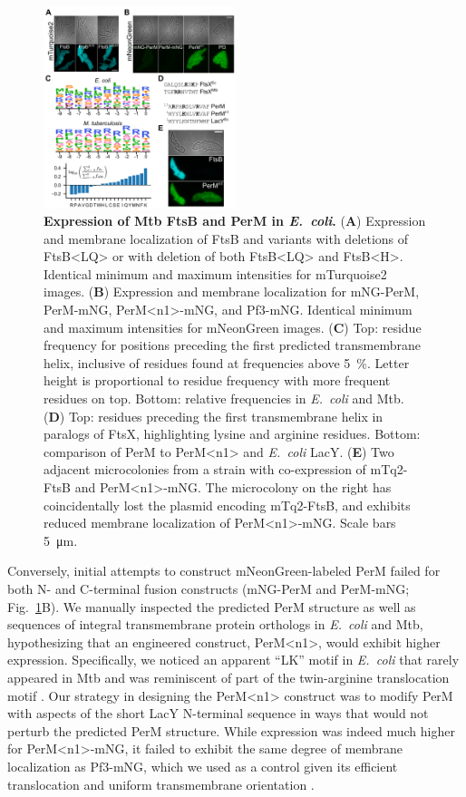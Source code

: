 \documentclass[twocolumn,pdflatex,sn-nature]{sn-jnl}%
\def\textsuperscript#1{<#1>}%
\newcommand\ec{\textit{E.~coli}}
\newcommand\mtb{Mtb}
\newcommand\ftsbLQ{FtsB\textsuperscript{LQ}}
\newcommand\ftsbH{FtsB\textsuperscript{H}}
\newcommand\permN{PerM\textsuperscript{n1}}
\begin{document}
\begin{figure}[htb]
    \centering
    \includegraphics[width=0.5\textwidth]{../figures/fig2.png}
    \caption{
        \textbf{Expression of \mtb{} FtsB and PerM in \ec{}.}
        (\textbf{A}) Expression and membrane localization of FtsB and variants with deletions of \ftsbLQ{} or with deletion of both \ftsbLQ{} and \ftsbH{}. Identical minimum and maximum intensities for mTurquoise2 images.
        (\textbf{B}) Expression and membrane localization for mNG-PerM, PerM-mNG, \permN{}-mNG, and Pf3-mNG. Identical minimum and maximum intensities for mNeonGreen images.
        (\textbf{C}) Top: residue frequency for positions preceding the first predicted transmembrane helix, inclusive of residues found at frequencies above \qty{5}{\percent}. Letter height is proportional to residue frequency with more frequent residues on top. Bottom: relative frequencies in \ec{} and \mtb{}.
        (\textbf{D}) Top: residues preceding the first transmembrane helix in paralogs of FtsX, highlighting lysine and arginine residues. Bottom: comparison of PerM to \permN{} and \ec{} LacY.
        (\textbf{E}) Two adjacent microcolonies from a strain with co-expression of mTq2-FtsB and \permN{}-mNG. The microcolony on the right has coincidentally lost the plasmid encoding mTq2-FtsB, and exhibits reduced membrane localization of \permN{}-mNG. Scale bars \qty{5}{\um}.
    }\label{fig2}
\end{figure}

Conversely, initial attempts to construct mNeonGreen-labeled PerM failed for both N- and C-terminal fusion constructs (mNG-PerM and PerM-mNG; Fig.~\ref{fig2}B).
We manually inspected the predicted PerM structure as well as sequences of integral transmembrane protein orthologs in \ec{} and \mtb{}, hypothesizing that an engineered construct, \permN{}, would exhibit higher expression.
Specifically, we noticed an apparent ``LK'' motif in \ec{} that rarely appeared in \mtb{} and was reminiscent of part of the twin-arginine translocation motif \citep{leeBacterialTwinArginineTranslocation2006}.
Our strategy in designing the \permN{} construct was to modify PerM with aspects of the short LacY N-terminal sequence in ways that would not perturb the predicted PerM structure.
While expression was indeed much higher for \permN{}-mNG, it failed to exhibit the same degree of membrane localization as Pf3-mNG, which we used as a control given its efficient translocation and uniform transmembrane orientation \citep{kieferNegativelyChargedAmino1997}.
\end{document}
